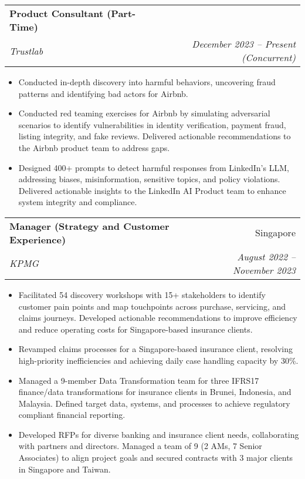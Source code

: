 \documentclass[letterpaper,11pt]{article}
\makeatletter
\newcommand{\resumeSubheading}[4]{
  \vspace{-1pt}\item
    \begin{tabular*}{0.97\textwidth}[t]{l@{\extracolsep{\fill}}r}
      \textbf{#1} & #2 \\
      \textit{\small#3} & \textit{\small #4} \\
    \end{tabular*}\vspace{-5pt}
}
\newcommand{\resumeItemListStart}{\begin{itemize}}
\newcommand{\resumeItemListEnd}{\end{itemize}\vspace{-5pt}}
\makeatother
\begin{document}
    \resumeSubheading
      {Product Consultant (Part-Time)}{}
      {Trustlab}{December 2023 -- Present (Concurrent)}
      \resumeItemListStart
        \item\small{Conducted in-depth discovery into harmful behaviors, uncovering fraud patterns and identifying bad actors for Airbnb.}
        \item\small{Conducted red teaming exercises for Airbnb by simulating adversarial scenarios to identify vulnerabilities in identity verification, payment fraud, listing integrity, and fake reviews. Delivered actionable recommendations to the Airbnb product team to address gaps.}
        \item\small{Designed 400+ prompts to detect harmful responses from LinkedIn's LLM, addressing biases, misinformation, sensitive topics, and policy violations. Delivered actionable insights to the LinkedIn AI Product team to enhance system integrity and compliance.}
      \resumeItemListEnd

    \resumeSubheading
      {Manager (Strategy and Customer Experience)}{Singapore}
      {KPMG}{August 2022 -- November 2023}
      \resumeItemListStart
        \item\small{Facilitated 54 discovery workshops with 15+ stakeholders to identify customer pain points and map touchpoints across purchase, servicing, and claims journeys. Developed actionable recommendations to improve efficiency and reduce operating costs for Singapore-based insurance clients.}
        \item\small{Revamped claims processes for a Singapore-based insurance client, resolving high-priority inefficiencies and achieving daily case handling capacity by 30\%.}
        \item\small{Managed a 9-member Data Transformation team for three IFRS17 finance/data transformations for insurance clients in Brunei, Indonesia, and Malaysia. Defined target data, systems, and processes to achieve regulatory compliant financial reporting.}
        \item\small{Developed RFPs for diverse banking and insurance client needs, collaborating with partners and directors. Managed a team of 9 (2 AMs, 7 Senior Associates) to align project goals and secured contracts with 3 major clients in Singapore and Taiwan.}
      \resumeItemListEnd
\end{document}
